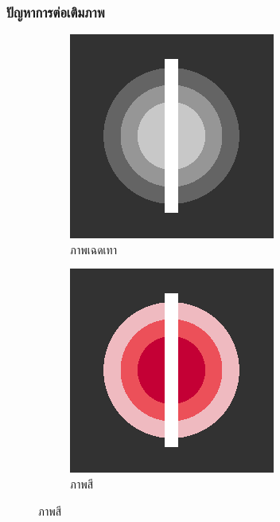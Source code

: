 \documentclass[xcolor=dvipsnames, xetex,serif]{beamer}
\numberwithin{equation}{section}
\begin{document}
    \begin{frame}
        \frametitle{ปัญหาการต่อเติมภาพ}
        \begin{figure}[H]
            \centering
            \begin{subfigure}{0.4\linewidth}
                \centering
                \includegraphics[width=0.8\linewidth]{images/grayscale_inpaint/toinpaint.png}
                \caption*{{\large ภาพเฉดเทา}}
            \end{subfigure}
            \begin{subfigure}{0.4\linewidth}
                \centering
                \includegraphics[width=0.8\linewidth]{images/image_inpaint_synthetic/case02-toinpaint.png}
                \caption*{{\large ภาพสี}}
            \end{subfigure}
        \end{figure}
    \end{frame}
\end{document}
